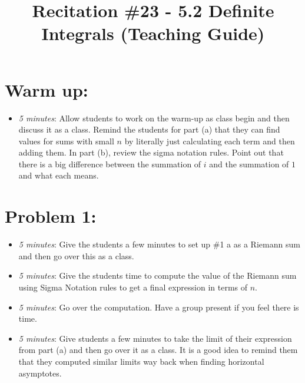 \documentclass[handout,nooutcomes]{ximera}
\title{Recitation \#23 - 5.2 Definite Integrals (Teaching Guide)}
\begin{document}
\begin{abstract}		\end{abstract}
\maketitle


\section*{Warm up:} 
	
	\begin{itemize}
	
	\item  \emph{5 minutes}:  Allow students to work on the warm-up as class begin and then discuss it as a class. Remind the students for part (a) that they can find values for sums with small $n$ by literally just calculating each term and then adding them.  In part (b), review the sigma notation rules.  Point out that there is a big difference between the summation of $i$ and the summation of $1$ and what each means.
	
	
	
	\end{itemize}


\section*{Problem 1:}

	\begin{itemize}
	
	\item  \emph{5 minutes}:  Give the students a few minutes to set up \#1 a as a Riemann sum and then go over this as a class.  
	
	\item  \emph{5 minutes}:  Give the students time to compute the value of the Riemann sum using Sigma Notation rules to get a final expression in terms of $n$.
	
	\item  \emph{5 minutes}:  Go over the computation.  Have a group present if you feel there is time.
	
	\item  \emph{5 minutes}:  Give students a few minutes to take the limit of their expression from part (a) and then go over it as a class.  It is a good idea to remind them that they computed similar limits way back when finding horizontal asymptotes.
	
	\end{itemize}
\end{document}
